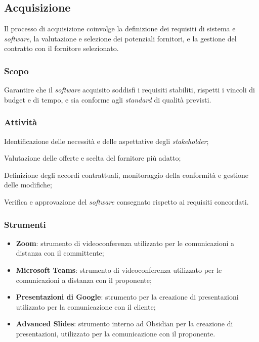 \subsection{Acquisizione}

Il processo di acquisizione coinvolge la definizione dei requisiti di sistema e
\textit{software}, la valutazione e selezione dei potenziali fornitori, e la gestione del
contratto con il fornitore selezionato.

\subsubsection{Scopo}
Garantire che il \textit{software} acquisito soddisfi i requisiti stabiliti, rispetti i
vincoli di budget e di tempo, e sia conforme agli \textit{standard} di qualità previsti.

\subsubsection{Attività}
Identificazione delle necessità e delle aspettative degli \textit{stakeholder};

Valutazione delle offerte e scelta del fornitore più adatto;

Definizione degli accordi contrattuali, monitoraggio della conformità e gestione 
delle modifiche;

Verifica e approvazione del \textit{software} consegnato rispetto ai requisiti 
concordati.

\subsubsection{Strumenti}
\begin{itemize}
	\item \textbf{Zoom}: strumento di videoconferenza utilizzato per le comunicazioni a distanza con il committente;
	\item \textbf{Microsoft Teams}: strumento di videoconferenza utilizzato per le comunicazioni a distanza con il proponente;
	\item \textbf{Presentazioni di Google}: strumento per la creazione di presentazioni utilizzato per la comunicazione con il cliente;
	\item \textbf{Advanced Slides}: strumento interno ad Obsidian per la creazione di presentazioni, utilizzato per la comunicazione con il proponente.
\end{itemize}
